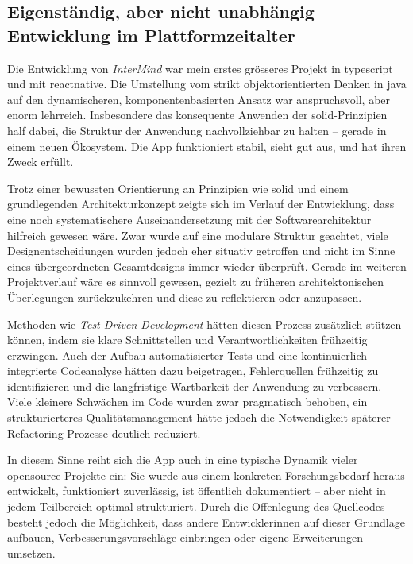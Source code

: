 \subsection{Eigenständig, aber nicht unabhängig – Entwicklung im Plattformzeitalter}

Die Entwicklung von \textit{InterMind} war mein erstes grösseres Projekt in \gls{typescript} und mit \gls{reactnative}. Die Umstellung vom strikt objektorientierten Denken in \gls{java} auf den dynamischeren, komponentenbasierten Ansatz war anspruchsvoll, aber enorm lehrreich. Insbesondere das konsequente Anwenden der \gls{solid}-Prinzipien half dabei, die Struktur der Anwendung nachvollziehbar zu halten – gerade in einem neuen Ökosystem. Die App funktioniert stabil, sieht gut aus, und hat ihren Zweck erfüllt.

Trotz einer bewussten Orientierung an Prinzipien wie \gls{solid} und einem grundlegenden Architekturkonzept zeigte sich im Verlauf der Entwicklung, dass eine noch systematischere Auseinandersetzung mit der Softwarearchitektur hilfreich gewesen wäre. Zwar wurde auf eine modulare Struktur geachtet, viele Designentscheidungen wurden jedoch eher situativ getroffen und nicht im Sinne eines übergeordneten Gesamtdesigns immer wieder überprüft. Gerade im weiteren Projektverlauf wäre es sinnvoll gewesen, gezielt zu früheren architektonischen Überlegungen zurückzukehren und diese zu reflektieren oder anzupassen.

Methoden wie \emph{Test-Driven Development} hätten diesen Prozess zusätzlich stützen können, indem sie klare Schnittstellen und Verantwortlichkeiten frühzeitig erzwingen. Auch der Aufbau automatisierter Tests und eine kontinuierlich integrierte Codeanalyse hätten dazu beigetragen, Fehlerquellen frühzeitig zu identifizieren und die langfristige Wartbarkeit der Anwendung zu verbessern. Viele kleinere Schwächen im Code wurden zwar pragmatisch behoben, ein strukturierteres Qualitätsmanagement hätte jedoch die Notwendigkeit späterer Refactoring-Prozesse deutlich reduziert.

In diesem Sinne reiht sich die App auch in eine typische Dynamik vieler \gls{opensource}-Projekte ein: Sie wurde aus einem konkreten Forschungsbedarf heraus entwickelt, funktioniert zuverlässig, ist öffentlich dokumentiert – aber nicht in jedem Teilbereich optimal strukturiert. Durch die Offenlegung des Quellcodes besteht jedoch die Möglichkeit, dass andere Entwickler\genderstern innen auf dieser Grundlage aufbauen, Verbesserungsvorschläge einbringen oder eigene Erweiterungen umsetzen.


